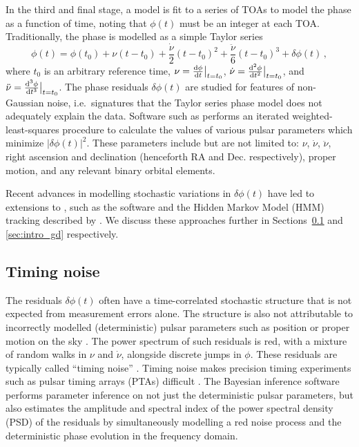 In the third and final stage, a model is fit to a series of TOAs to model the phase as a function of time, noting that $\phi(t)$ must be an integer at each TOA. Traditionally, the phase is modelled as a simple Taylor series 
\begin{equation}
    \phi(t) = \phi(t_0) + \nu (t - t_0) + \frac{\dot{\nu}}{2}\left(t - t_0\right)^2 + \frac{\ddot{\nu}}{6} \left(t - t_0\right)^3 + \delta\phi(t)\,,\label{eq:taylor_phase}
\end{equation}
where $t_0$ is an arbitrary reference time, $\nu = \frac{\textrm{d}\phi}{\textrm{d} t}\big|_{t=t_0}$, $\dot{\nu} = \frac{\textrm{d}^2\phi}{\textrm{d} t^2}\big|_{t=t_0}$, and $\ddot{\nu} = \frac{\textrm{d}^3\phi}{\textrm{d} t^3}\big|_{t=t_0}$. The phase residuals $\delta\phi(t)$ are studied for features of non-Gaussian noise, i.e.~signatures that the Taylor series phase model does not adequately explain the data. Software such as {} \citep{Hobbs2006,Edwards2006} performs an iterated weighted-least-squares \citep{Press2007} procedure to calculate the values of various pulsar parameters which minimize $|\delta\phi(t)|^2$. These parameters include but are not limited to: $\nu$, $\dot{\nu}$, $\ddot{\nu}$, right ascension and declination (henceforth RA and Dec. respectively), proper motion, and any relevant binary orbital elements.

Recent advances in modelling stochastic variations in $\delta\phi(t)$ have led to extensions to {}, such as the software {} \citep{Lentati2014} and the Hidden Markov Model (HMM) tracking described by \citet{Melatos2020hmm}. We discuss these approaches further in Sections~\ref{sec:intro_tn} and \ref{sec:intro_gd} respectively.

\subsection{Timing noise} \label{sec:intro_tn}
The residuals $\delta\phi(t)$ often have a time-correlated stochastic structure that is not expected from measurement errors alone. The structure is also not attributable to incorrectly modelled (deterministic) pulsar parameters such as position or proper motion on the sky \citep{Cordes1980,Shannon2010}. The power spectrum of such residuals is red, with a mixture of random walks in $\nu$ and $\dot{\nu}$, alongside discrete jumps in $\phi$. These residuals are typically called ``timing noise'' \citep{Cordes1985,DAlessandro1995}. Timing noise makes precision timing experiments such as pulsar timing arrays (PTAs) difficult \citep{Perera2019,Arzoumanian2020,Chen2021,Goncharov2021a}. The Bayesian inference software {} performs parameter inference on not just the deterministic pulsar parameters, but also estimates the amplitude and spectral index of the power spectral density (PSD) of the residuals by simultaneously modelling a red noise process and the deterministic phase evolution in the frequency domain.   

